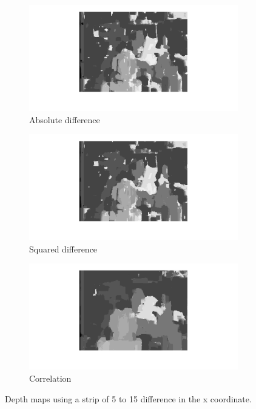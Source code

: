 \documentclass{article}
\begin{document}
\begin{figure}[ht!]
 \centering
 \begin{subfigure}{\textwidth}
  \centering
  \includegraphics[width=1\linewidth]{abs_patch15.png}
  \caption{Absolute difference}
  \label{fig2a}
 \end{subfigure}
 \begin{subfigure}{\textwidth}
  \centering
  \includegraphics[width=1\linewidth]{squared_patch15.png}
  \caption{Squared difference}
  \label{fig2b}
 \end{subfigure}
 \begin{subfigure}{\textwidth}
  \centering
  \includegraphics[width=\linewidth]{corr_patch15.png}
  \caption{Correlation}
  \label{fig2c}
 \end{subfigure}
 \caption{Depth maps using a strip of 5 to 15 difference in the x coordinate.}
 \label{fig2}
\end{figure}
\end{document}
